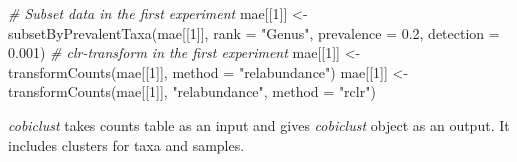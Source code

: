 \documentclass[
]{book}
\newenvironment{Shaded}{\begin{snugshade}}{\end{snugshade}}
\newcommand{\AttributeTok}[1]{\textcolor[rgb]{0.77,0.63,0.00}{#1}}
\newcommand{\CommentTok}[1]{\textcolor[rgb]{0.56,0.35,0.01}{\textit{#1}}}
\newcommand{\DecValTok}[1]{\textcolor[rgb]{0.00,0.00,0.81}{#1}}
\newcommand{\FloatTok}[1]{\textcolor[rgb]{0.00,0.00,0.81}{#1}}
\newcommand{\FunctionTok}[1]{\textcolor[rgb]{0.00,0.00,0.00}{#1}}
\newcommand{\NormalTok}[1]{#1}
\newcommand{\OtherTok}[1]{\textcolor[rgb]{0.56,0.35,0.01}{#1}}
\newcommand{\StringTok}[1]{\textcolor[rgb]{0.31,0.60,0.02}{#1}}
\begin{document}
\begin{Shaded}
\begin{Highlighting}[]
\CommentTok{\# Subset data in the first experiment}
\NormalTok{mae[[}\DecValTok{1}\NormalTok{]] }\OtherTok{\textless{}{-}} \FunctionTok{subsetByPrevalentTaxa}\NormalTok{(mae[[}\DecValTok{1}\NormalTok{]], }\AttributeTok{rank =} \StringTok{"Genus"}\NormalTok{, }\AttributeTok{prevalence =} \FloatTok{0.2}\NormalTok{, }\AttributeTok{detection =} \FloatTok{0.001}\NormalTok{)}
\CommentTok{\# clr{-}transform in the first experiment}
\NormalTok{mae[[}\DecValTok{1}\NormalTok{]] }\OtherTok{\textless{}{-}} \FunctionTok{transformCounts}\NormalTok{(mae[[}\DecValTok{1}\NormalTok{]], }\AttributeTok{method =} \StringTok{"relabundance"}\NormalTok{)}
\NormalTok{mae[[}\DecValTok{1}\NormalTok{]] }\OtherTok{\textless{}{-}} \FunctionTok{transformCounts}\NormalTok{(mae[[}\DecValTok{1}\NormalTok{]], }\StringTok{"relabundance"}\NormalTok{, }\AttributeTok{method =} \StringTok{"rclr"}\NormalTok{)}
\end{Highlighting}
\end{Shaded}

\emph{cobiclust} takes counts table as an input and gives \emph{cobiclust} object as an output.
It includes clusters for taxa and samples.
\end{document}
